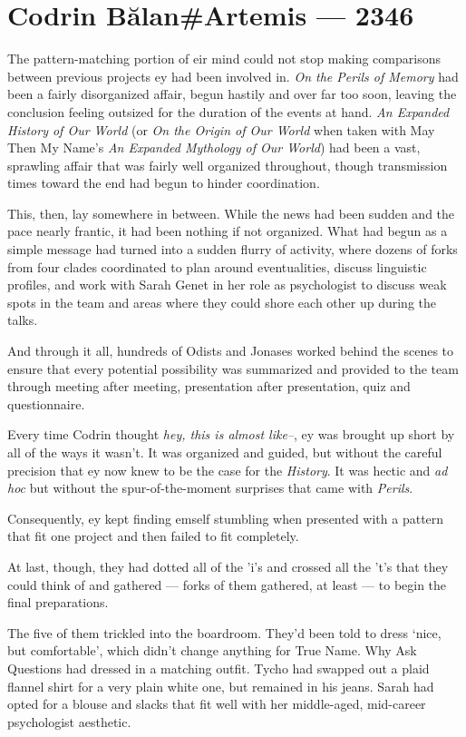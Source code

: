 \hypertarget{codrin-bux103lanartemis-2346}{%
\chapter{Codrin Bălan\#Artemis — 2346}\label{codrin-bux103lanartemis-2346}}

The pattern-matching portion of eir mind could not stop making comparisons between previous projects ey had been involved in. \emph{On the Perils of Memory} had been a fairly disorganized affair, begun hastily and over far too soon, leaving the conclusion feeling outsized for the duration of the events at hand. \emph{An Expanded History of Our World} (or \emph{On the Origin of Our World} when taken with May Then My Name's \emph{An Expanded Mythology of Our World}) had been a vast, sprawling affair that was fairly well organized throughout, though transmission times toward the end had begun to hinder coordination.

This, then, lay somewhere in between. While the news had been sudden and the pace nearly frantic, it had been nothing if not organized. What had begun as a simple message had turned into a sudden flurry of activity, where dozens of forks from four clades coordinated to plan around eventualities, discuss linguistic profiles, and work with Sarah Genet in her role as psychologist to discuss weak spots in the team and areas where they could shore each other up during the talks.

And through it all, hundreds of Odists and Jonases worked behind the scenes to ensure that every potential possibility was summarized and provided to the team through meeting after meeting, presentation after presentation, quiz and questionnaire.

Every time Codrin thought \emph{hey, this is almost like--}, ey was brought up short by all of the ways it wasn't. It was organized and guided, but without the careful precision that ey now knew to be the case for the \emph{History}. It was hectic and \emph{ad hoc} but without the spur-of-the-moment surprises that came with \emph{Perils}.

Consequently, ey kept finding emself stumbling when presented with a pattern that fit one project and then failed to fit completely.

At last, though, they had dotted all of the 'i's and crossed all the 't's that they could think of and gathered — forks of them gathered, at least — to begin the final preparations.

The five of them trickled into the boardroom. They'd been told to dress `nice, but comfortable', which didn't change anything for True Name. Why Ask Questions had dressed in a matching outfit. Tycho had swapped out a plaid flannel shirt for a very plain white one, but remained in his jeans. Sarah had opted for a blouse and slacks that fit well with her middle-aged, mid-career psychologist aesthetic.

